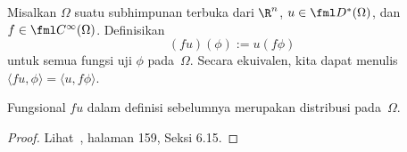 \begin{defn} Misalkan $\Omega$ suatu subhimpunan terbuka dari $\R^n$, $u \in \fml D^*(\Omega)$, dan $f \in \fml C^\infty(\Omega)$.
Definisikan
   \[ (fu)(\phi) := u(f\phi) \]
untuk semua fungsi uji $\phi$ pada~$\Omega$. Secara ekuivalen, kita dapat menulis $\langle fu,\phi \rangle = \langle u,f\phi \rangle$.
\end{defn}

\begin{prop} Fungsional $fu$ dalam definisi sebelumnya merupakan distribusi pada~$\Omega$.
\end{prop}

\begin{proof} Lihat~\cite{Rudin:1991}, halaman 159, Seksi 6.15.    \ns
\end{proof}






















